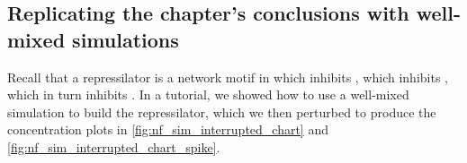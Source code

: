 \subsection{Replicating the chapter's conclusions with well-mixed simulations}

Recall that a repressilator is a network motif in which  inhibits , which inhibits , which in turn inhibits . In a tutorial, we showed how to use a well-mixed simulation to build the repressilator, which we then perturbed to produce the concentration plots in \autoref{fig:nf_sim_interrupted_chart} and \autoref{fig:nf_sim_interrupted_chart_spike}.\\

\begin{exercise}\end{exercise}
